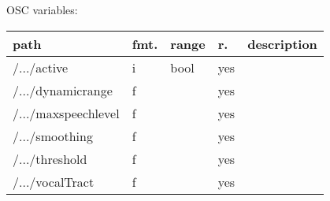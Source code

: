 \begin{snugshade}
{\footnotesize
\label{osctab:tascaraplipsyncpaper}
OSC variables:
\nopagebreak

\begin{tabularx}{\textwidth}{llllX}
\hline
path & fmt. & range & r. & description\\
\hline
/.../active & i & bool & yes & \\
/.../dynamicrange & f &  & yes & \\
/.../maxspeechlevel & f &  & yes & \\
/.../smoothing & f &  & yes & \\
/.../threshold & f &  & yes & \\
/.../vocalTract & f &  & yes & \\
\hline
\end{tabularx}
}
\end{snugshade}
